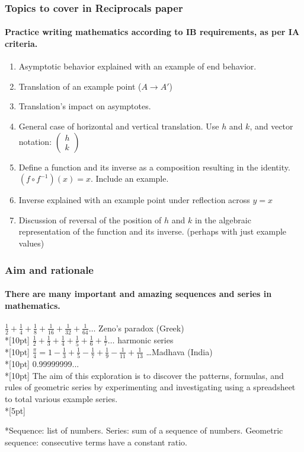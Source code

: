 \documentclass{beamer}
\begin{document}
 \frame
 {
   \frametitle{Topics to cover in Reciprocals paper}
   \framesubtitle{Practice writing mathematics according to IB requirements, as per IA criteria.}
 \begin{enumerate}
 \item Asymptotic behavior explained with an example of end behavior.
 \item Translation of an example point ($A \xrightarrow{} A'$)
 \item Translation's impact on asymptotes.
 \item General case of horizontal and vertical translation. Use $h$ and $k$, and vector notation: $\begin{pmatrix} h \\ k \end{pmatrix}$
 \item Define a function and its inverse as a composition resulting in the identity. $(f \circ f^{-1})(x)=x$. Include an example.
 \item Inverse explained with an example point under reflection across $y=x$
 \item Discussion of reversal of the position of $h$ and $k$ in the algebraic representation of the function and its inverse. (perhaps with just example values)
 \end{enumerate}
 }


 \frame
 {
   \frametitle{Aim and rationale}
   \framesubtitle{There are many important and amazing sequences and series in mathematics.}
   $\displaystyle \frac{1}{2}+\frac{1}{4}+\frac{1}{8}+\frac{1}{16}+\frac{1}{32}+\frac{1}{64} \dots$ Zeno's paradox (Greek)\\*[10pt]  $\displaystyle \frac{1}{2}+\frac{1}{3}+\frac{1}{4}+\frac{1}{5}+\frac{1}{6}+\frac{1}{7} \dots$ harmonic series\\*[10pt]
   $\displaystyle \frac{\pi}{4}=1-\frac{1}{3}+\frac{1}{5}-\frac{1}{7}+\frac{1}{9}-\frac{1}{11}+\frac{1}{13}$ \dots Madhava  (India)\\*[10pt]
   0.99999999...\\*[10pt]
 The aim of this exploration is to discover the patterns, formulas, and rules of geometric series by experimenting and investigating using a spreadsheet to total various example series.\\*[5pt]

 *Sequence: list of numbers. Series: sum of a sequence of numbers. Geometric sequence: consecutive terms have a constant ratio.
 }



 
\end{document}
